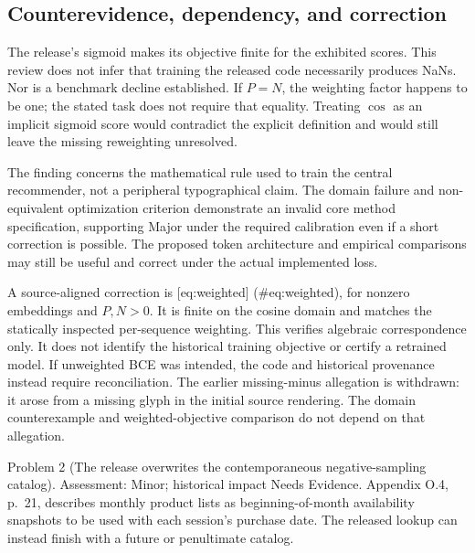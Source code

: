 \documentclass[10pt]{article}
\begin{document}
\subsection*{Counterevidence, dependency, and correction}
The release’s sigmoid makes its objective finite for the exhibited scores. This review does not infer that training the released code necessarily produces NaNs. Nor is a benchmark decline established. If \(P=N\), the weighting factor happens to be one; the stated task does not require that equality. Treating \(\cos\) as an implicit sigmoid score would contradict the explicit definition and would still leave the missing reweighting unresolved.\par
The finding concerns the mathematical rule used to train the central recommender, not a peripheral typographical claim. The domain failure and non-equivalent optimization criterion demonstrate an invalid core method specification, supporting Major under the required calibration even if a short correction is possible. The proposed token architecture and empirical comparisons may still be useful and correct under the actual implemented loss.\par
A source-aligned correction is [eq:weighted] (\#eq:weighted), for nonzero embeddings and \(P,N>0\). It is finite on the cosine domain and matches the statically inspected per-sequence weighting. This verifies algebraic correspondence only. It does not identify the historical training objective or certify a retrained model. If unweighted BCE was intended, the code and historical provenance instead require reconciliation. The earlier missing-minus allegation is withdrawn: it arose from a missing glyph in the initial source rendering. The domain counterexample and weighted-objective comparison do not depend on that allegation.\par
Problem 2 (The release overwrites the contemporaneous negative-sampling catalog).  Assessment: Minor; historical impact Needs Evidence. Appendix O.4, p. 21, describes monthly product lists as beginning-of-month availability snapshots to be used with each session’s purchase date. The released lookup can instead finish with a future or penultimate catalog.\par
\end{document}
